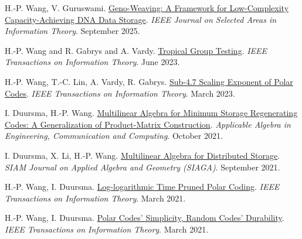 \documentclass{article}
\def\sec#1{\vskip1em\textbf{\fs1#1}}
\def\fs#1{%
        \pgfmathsetmacro\a{#1}%
        \pgfmathsetmacro\A{\parskip*(4/3)^\a}%
        \pgfmathsetmacro\B{\A*(4/3)}%
        \fontsize{\A pt}{\B pt}\selectfont%
    }
\begin{document}
\bgroup
\def\section#1#2{\sec{Journal Publications \mdseries (new to old)}}
\begin{thebibliography}{J9}
    H.-P. Wang, V. Guruswami.
    \href{https://doi.org/10.1109/JSAIT.2025.3610643}
    {Geno-Weaving: A Framework for Low-Complexity Capacity-Achieving DNA Data Storage}.
    \emph{IEEE Journal on Selected Areas in Information Theory}.
   September 2025.

    H.-P. Wang and R. Gabrys and A. Vardy.
    \href{https://doi.org/10.1109/TIT.2023.3282847}
    {Tropical Group Testing}.
    \emph{IEEE Transactions on Information Theory}.
    June 2023.

    H.-P. Wang, T.-C. Lin, A. Vardy, R. Gabrys.
    \href{https://doi.org/10.1109/TIT.2023.3253074}
    {Sub-4.7 Scaling Exponent of Polar Codes}.
    \emph{IEEE Transactions on Information Theory}.
    March 2023.

    I. Duursma, H.-P. Wang.
    \href{https://doi.org/10.1007/s00200-021-00526-3}
    {Multilinear Algebra for Minimum Storage Regenerating Codes: A Generalization of Product-Matrix Construction}.
    \emph{Applicable Algebra in Engineering, Communication and Computing}.
    October 2021.

    I. Duursma, X. Li, H.-P. Wang.
    \href{https://doi.org/10.1137/20M1346742}
    {Multilinear Algebra for Distributed Storage}.
    \emph{SIAM Journal on Applied Algebra and Geometry (SIAGA)}.
    September 2021.

    H.-P. Wang, I. Duursma.
    \href{https://doi.org/10.1109/TIT.2020.3041523}
    {Log-logarithmic Time Pruned Polar Coding}.
    \emph{IEEE Transactions on Information Theory}.
    March 2021.

    H.-P. Wang, I. Duursma.
    \href{https://doi.org/10.1109/TIT.2020.3041570}
    {Polar Codes' Simplicity, Random Codes' Durability}.
    \emph{IEEE Transactions on Information Theory}.
    March 2021.
\end{thebibliography}
\egroup
\end{document}
